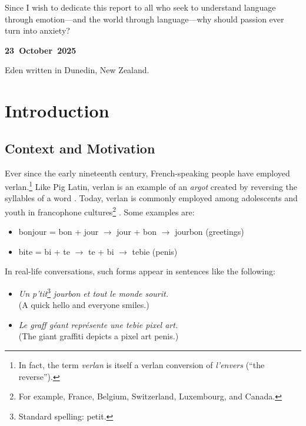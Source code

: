 \documentclass[12pt]{article}
\newif\ifskipsectionclear
\begin{document}
Since I wish to dedicate this report to all who seek to understand language through emotion\;---\;and the world through language\;---\;why should passion ever turn into anxiety?

\vspace{2em}
\begin{flushright}
\textbf{23~October~2025}

\vspace{0.5em}

Eden written in Dunedin, New Zealand.
\end{flushright}
\cleardoublepage
\skipsectioncleartrue
{}
\setcounter{page}{1}
\section{Introduction}
\subsection{Context and Motivation}

Ever since the early nineteenth century, French-speaking people have employed verlan.\footnote{In fact, the term \textit{verlan} is itself a verlan conversion of \textit{l'envers} (``the reverse'').} 
Like Pig Latin, verlan is an example of an \textit{argot} created by reversing the syllables of a word \cite{rajabov2025,bach2018}. Today, verlan is commonly employed among adolescents and youth in francophone cultures\footnote{For example, France, Belgium, Switzerland, Luxembourg, and Canada.} \cite{evolutionverlan}. Some examples are:

\begin{flushleft}
\small
\begin{itemize}
  \item bonjour = bon + jour \(\rightarrow\) jour + bon \(\rightarrow\) jourbon (greetings)
  \item bite = bi + te \(\rightarrow\) te + bi \(\rightarrow\) tebie (penis)
\end{itemize}
\end{flushleft}

\noindent In real-life conversations, such forms appear in sentences like the following:

\begin{flushleft}
\small
\begin{itemize}
  \item \textit{Un p'tit}\footnote{Standard spelling: petit.}\textit{ jourbon et tout le monde sourit.}\\(A quick hello and everyone smiles.)
  \item \textit{Le graff géant représente une tebie pixel art.}\\(The giant graffiti depicts a pixel art penis.)
\end{itemize}
\end{flushleft}
\end{document}
